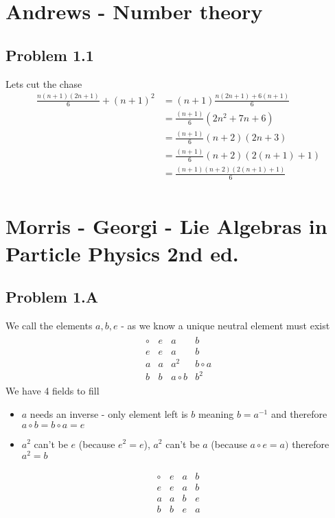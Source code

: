 \documentclass[../main.tex]{subfiles}
\begin{document}
\section{{\sc Andrews} - Number theory}
\subsection{Problem 1.1}
Lets cut the chase
\begin{align}
\frac{n(n+1)(2n+1)}{6}+(n+1)^2
&=(n+1)\frac{n(2n+1)+6(n+1)}{6}\\
&=\frac{(n+1)}{6}(2n^2+7n+6)\\
&=\frac{(n+1)}{6}(n+2)(2n+3)\\
&=\frac{(n+1)}{6}(n+2)(2(n+1)+1)\\
&=\frac{(n+1)(n+2)(2(n+1)+1)}{6}\\
\end{align}

\section{{\sc Morris} - Georgi - Lie Algebras in Particle Physics 2nd ed.}
\subsection{Problem 1.A}
We call the elements $a, b, e$ - as we know a unique neutral element must exist 
\begin{align}
\begin{array}{c|ccc}
\circ & e & a   & b\\ \hline
e     & e & a   & b\\
a     & a & a^2 & b\circ a \\
b     & b & a\circ b & b^2
\end{array}
\end{align}
We have 4 fields to fill
\begin{itemize}
\item $a$ needs an inverse - only element left is $b$ meaning $b=a^{-1}$ and therefore $a\circ b=b\circ a=e$ 
\item $a^2$ can't be $e$ (because $e^2=e$), $a^2$ can't be $a$ (because $a\circ e = a)$ therefore $a^2=b$
\end{itemize}

\begin{align}
\begin{array}{c|ccc}
\circ & e & a   & b\\ \hline
e     & e & a   & b\\
a     & a & b & e \\
b     & b & e & a
\end{array}
\end{align}
\end{document}
